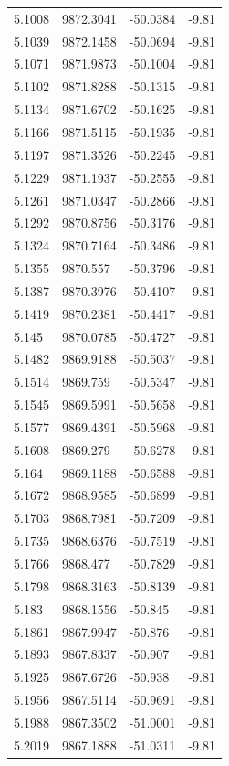 \begin{table}[H]
\begin{tabular}{llll}
5.1008 & 9872.3041 & -50.0384 & -9.81 \\
5.1039 & 9872.1458 & -50.0694 & -9.81 \\
5.1071 & 9871.9873 & -50.1004 & -9.81 \\
5.1102 & 9871.8288 & -50.1315 & -9.81 \\
5.1134 & 9871.6702 & -50.1625 & -9.81 \\
5.1166 & 9871.5115 & -50.1935 & -9.81 \\
5.1197 & 9871.3526 & -50.2245 & -9.81 \\
5.1229 & 9871.1937 & -50.2555 & -9.81 \\
5.1261 & 9871.0347 & -50.2866 & -9.81 \\
5.1292 & 9870.8756 & -50.3176 & -9.81 \\
5.1324 & 9870.7164 & -50.3486 & -9.81 \\
5.1355 & 9870.557 & -50.3796 & -9.81 \\
5.1387 & 9870.3976 & -50.4107 & -9.81 \\
5.1419 & 9870.2381 & -50.4417 & -9.81 \\
5.145 & 9870.0785 & -50.4727 & -9.81 \\
5.1482 & 9869.9188 & -50.5037 & -9.81 \\
5.1514 & 9869.759 & -50.5347 & -9.81 \\
5.1545 & 9869.5991 & -50.5658 & -9.81 \\
5.1577 & 9869.4391 & -50.5968 & -9.81 \\
5.1608 & 9869.279 & -50.6278 & -9.81 \\
5.164 & 9869.1188 & -50.6588 & -9.81 \\
5.1672 & 9868.9585 & -50.6899 & -9.81 \\
5.1703 & 9868.7981 & -50.7209 & -9.81 \\
5.1735 & 9868.6376 & -50.7519 & -9.81 \\
5.1766 & 9868.477 & -50.7829 & -9.81 \\
5.1798 & 9868.3163 & -50.8139 & -9.81 \\
5.183 & 9868.1556 & -50.845 & -9.81 \\
5.1861 & 9867.9947 & -50.876 & -9.81 \\
5.1893 & 9867.8337 & -50.907 & -9.81 \\
5.1925 & 9867.6726 & -50.938 & -9.81 \\
5.1956 & 9867.5114 & -50.9691 & -9.81 \\
5.1988 & 9867.3502 & -51.0001 & -9.81 \\
5.2019 & 9867.1888 & -51.0311 & -9.81 \\

\end{tabular}
\end{table}
